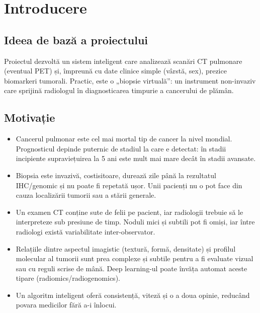 \documentclass[runningheads,a4paper,11pt]{report}
\begin{document}
\newpage


\chapter{Introducere}
\label{chapter:introducere}

\section{Ideea de bază a proiectului}
Proiectul dezvoltă un sistem inteligent care analizează scanări CT pulmonare (eventual PET) și, împreună cu date clinice simple (vârstă, sex), prezice biomarkeri tumorali. Practic, este o „biopsie virtuală”: un instrument non-invaziv care sprijină radiologul în diagnosticarea timpurie a cancerului de plămân.

\section{Motivație}
\begin{itemize}
    \item Cancerul pulmonar este cel mai mortal tip de cancer la nivel mondial. Prognosticul depinde puternic de stadiul la care e detectat: în stadii incipiente supraviețuirea la 5 ani este mult mai mare decât în stadii avansate.
    \item Biopsia este invazivă, costisitoare, durează zile până la rezultatul IHC/genomic și nu poate fi repetată ușor. Unii pacienți nu o pot face din cauza localizării tumorii sau a stării generale.
    \item Un examen CT conține sute de felii pe pacient, iar radiologii trebuie să le interpreteze sub presiune de timp. Noduli mici și subtili pot fi omiși, iar între radiologi există variabilitate inter-observator.
    \item Relațiile dintre aspectul imagistic (textură, formă, densitate) și profilul molecular al tumorii sunt prea complexe și subtile pentru a fi evaluate vizual sau cu reguli scrise de mână. Deep learning-ul poate învăța automat aceste tipare (radiomics/radiogenomics).
    \item Un algoritm inteligent oferă consistență, viteză și o a doua opinie, reducând povara medicilor fără a-i înlocui.
\end{itemize}
\end{document}
